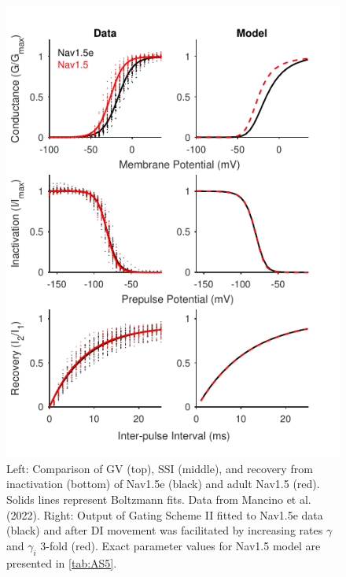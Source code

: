 \begin{figure}[t]
\begin{minipage}[c]{85mm}
    \centering
    \includegraphics[width=\textwidth]{Figures/AppendixA/figure11.pdf}
\end{minipage}\hfill
\begin{minipage}[c]{70mm}
    \caption{
Left: Comparison of GV (top), SSI (middle), and recovery from inactivation (bottom) of Nav1.5e (black) and adult Nav1.5 (red). Solids lines represent Boltzmann fits. Data from Mancino et al. (2022).  Right: Output of Gating Scheme II fitted to Nav1.5e data (black) and after DI movement was facilitated by increasing rates $\gamma$ and $\gamma_i$ 3-fold (red). Exact parameter values for Nav1.5 model are presented in \autoref{tab:AS5}.}
\label{fig:A11}
\end{minipage}
\end{figure}

